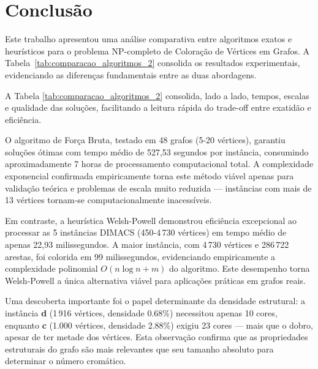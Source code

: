 \documentclass[12pt]{article}
\begin{document}
\newpage
\section{Conclusão}

Este trabalho apresentou uma análise comparativa entre algoritmos exatos e heurísticos para o problema NP-completo de Coloração de Vértices em Grafos. A Tabela~\ref{tab:comparacao_algoritmos_2} consolida os resultados experimentais, evidenciando as diferenças fundamentais entre as duas abordagens.



A Tabela \ref{tab:comparacao_algoritmos_2} consolida, lado a lado, tempos, escalas e qualidade das soluções, facilitando a leitura rápida do trade-off entre exatidão e eficiência.

O algoritmo de Força Bruta, testado em 48 grafos (5-20 vértices), garantiu soluções ótimas com tempo médio de 527,53 segundos por instância, consumindo aproximadamente 7 horas de processamento computacional total. A complexidade exponencial confirmada empiricamente torna este método viável apenas para validação teórica e problemas de escala muito reduzida — instâncias com mais de 13 vértices tornam-se computacionalmente inacessíveis.

Em contraste, a heurística Welsh-Powell demonstrou eficiência excepcional ao processar as 5 instâncias DIMACS (450-4\,730 vértices) em tempo médio de apenas 22,93 milissegundos. A maior instância, com 4\,730 vértices e 286\,722 arestas, foi colorida em 99 milissegundos, evidenciando empiricamente a complexidade polinomial $O(n \log n + m)$ do algoritmo. Este desempenho torna Welsh-Powell a única alternativa viável para aplicações práticas em grafos reais.

Uma descoberta importante foi o papel determinante da densidade estrutural: a instância \textbf{d} (1\,916 vértices, densidade 0.68\%) necessitou apenas 10 cores, enquanto \textbf{c} (1.000 vértices, densidade 2.88\%) exigiu 23 cores — mais que o dobro, apesar de ter metade dos vértices. Esta observação confirma que as propriedades estruturais do grafo são mais relevantes que seu tamanho absoluto para determinar o número cromático.
\end{document}
